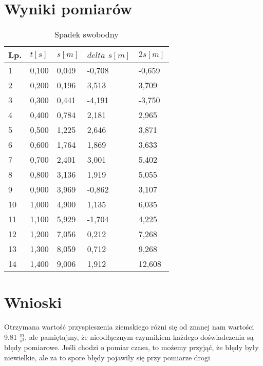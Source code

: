 \documentclass{article}
\begin{document}
\section{Wyniki pomiarów}
\begin{table}[hp]
\caption{Spadek swobodny}
\label{tab: Spadek_swobodny}
\begin{center}
\begin{tabular}{|l|l|l|l|l|}
\hline Lp. & $t[s]$ & $s[m]$ & $delta$ $s[m]$ & $2s[m]$\\
\hline
1 & 0,100 & 0,049 & -0,708 & -0,659\\\hline
2 & 0,200 & 0,196 & 3,513 & 3,709\\\hline
3 & 0,300 & 0,441 & -4,191 & -3,750\\\hline
4 & 0,400 & 0,784 & 2,181 & 2,965\\\hline
5 & 0,500 & 1,225 & 2,646 & 3,871\\\hline
6 & 0,600 & 1,764 & 1,869 & 3,633\\\hline
7 & 0,700 & 2,401 & 3,001 & 5,402\\\hline
8 & 0,800 & 3,136 & 1,919 & 5,055\\\hline
9 & 0,900 & 3,969 & -0,862 & 3,107\\\hline
10 & 1,000 & 4,900 & 1,135 & 6,035\\\hline
11 & 1,100 & 5,929 & -1,704 & 4,225\\\hline
12 & 1,200 & 7,056 & 0,212 & 7,268\\\hline
13 & 1,300 & 8,059 & 0,712 & 9,268\\\hline
14 & 1,400 & 9,006 & 1,912 & 12,608\\\hline
\end{tabular}
\end{center}
\end{table}



\newpage
\section{Wnioski}
Otrzymana wartość przyspieszenia ziemskiego różni się od znanej nam wartości 9.81 $\frac{m}{s^2}$, ale
pamiętajmy, że nieodłącznym czynnikiem każdego doświadczenia są błędy pomiarowe. Jeśli chodzi o
pomiar czasu, to możemy przyjąć, że błędy były niewielkie, ale za to spore błędy pojawiły się przy
pomiarze drogi
\end{document}
